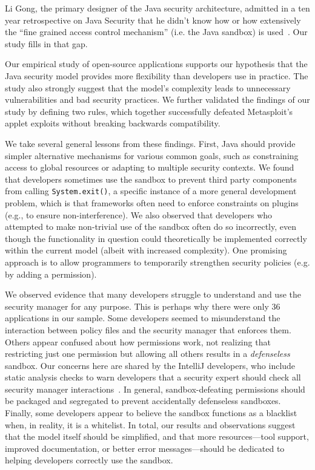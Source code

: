\documentclass{sig-alternate}
\begin{document}
Li Gong, the primary designer of the Java security architecture,
admitted in a ten year retrospective on Java Security that he didn't
know how or how extensively the ``fine grained access control mechanism''
(i.e. the Java sandbox) is used~\cite{gong2009java}.
Our study fills in that gap.

Our empirical study of open-source applications
supports our hypothesis that the Java security
model provides more flexibility than developers use in practice.  The study also
strongly suggest that the model's complexity leads to unnecessary 
vulnerabilities and bad security practices. 
We further validated the findings of our study by defining two rules, which together successfully
defeated Metasploit's applet exploits without breaking backwards compatibility.

We take several general lessons from these findings.  First, Java should provide 
simpler alternative mechanisms for various common goals, such as constraining 
access to global resources or adapting to multiple security contexts. 
We found that developers sometimes use the sandbox to prevent third party components from calling
\texttt{System.exit()}, a specific instance of a more general development
problem, which is that frameworks often need to enforce constraints on plugins
(e.g., to ensure non-interference).  We also observed that developers who attempted
to make non-trivial use of the sandbox often do so incorrectly, even though
the functionality in question could theoretically be implemented correctly
within the current model (albeit with increased complexity). 
One promising approach is to allow programmers
to temporarily strengthen security policies (e.g. by adding a permission). 

We observed evidence that many developers struggle to understand and
use the security manager for any purpose. This is perhaps why there
were only 36 applications in our sample. Some developers seemed to
misunderstand the interaction between policy files and the security
manager that enforces them. Others appear confused
about how permissions work, not realizing that
restricting just one permission but allowing all others results in a
\emph{defenseless} sandbox.  Our concerns here are shared by the IntelliJ developers,
who include static analysis checks to warn developers that a security expert
should check all security manager interactions~\cite{intelliJ}.  In general, sandbox-defeating permissions
should be packaged and segregated to prevent accidentally 
defenseless sandboxes. Finally, some developers appear to believe
the sandbox functions as a blacklist when, in reality, it is a whitelist.
In total, our results and observations suggest that the model itself should be simplified, and
that more resources---tool support, improved
documentation, or better error messages---should be dedicated to helping
developers correctly use the sandbox.



\end{document}
